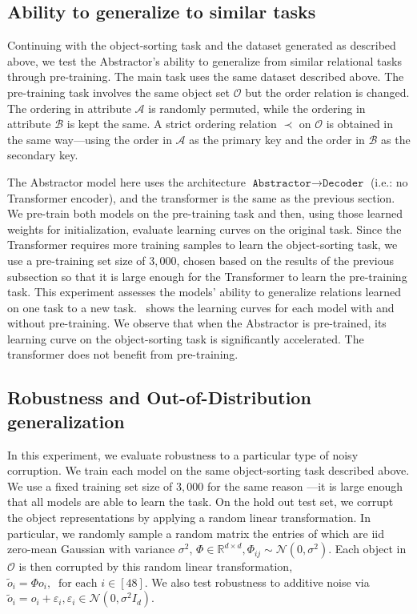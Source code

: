 \subsection{Ability to generalize to similar tasks}

Continuing with the object-sorting task and the dataset generated as described above, we test the Abstractor's ability to generalize from similar relational tasks through pre-training. The main task uses the same dataset described above. The pre-training task involves the same object set $\mathcal{O}$ but the order relation is changed. The ordering in attribute $\mathcal{A}$ is randomly permuted, while the ordering in attribute $\mathcal{B}$ is kept the same. A strict ordering relation $\prec$ on $\mathcal{O}$ is obtained in the same way---using the order in $\mathcal{A}$ as the primary key and the order in $\mathcal{B}$ as the secondary key.

The Abstractor model here uses the architecture $\texttt{Abstractor} \to \texttt{Decoder}$ (i.e.: no Transformer
encoder), and the transformer is the same as the previous section. We pre-train both models on the pre-training task
and then, using those learned weights for initialization, evaluate learning curves on the original task. Since the
Transformer requires more training samples to learn the object-sorting task, we use a pre-training set size of $3,000$, chosen based on the results of the previous subsection so that it is large enough for the Transformer to learn the pre-training task. This experiment assesses the models' ability to generalize relations learned on one task to a new task.~ shows the learning curves for each model with and without pre-training. We observe that when the Abstractor is pre-trained, its learning curve on the object-sorting task is significantly accelerated. The transformer does not benefit from pre-training.

\subsection{Robustness and Out-of-Distribution generalization}
In this experiment, we evaluate robustness to a particular type of noisy corruption. We train each model on the same
object-sorting task described above. We use a fixed training set size of $3,000$ for the same reason
---it is large enough that all models are able to learn the task. On the hold out test set, we corrupt the object
representations by applying a random linear transformation. In particular, we randomly sample a random matrix the
entries of which are iid zero-mean Gaussian with variance $\sigma^2$, $\Phi \in \mathbb{R}^{d \times d}, \Phi_{ij} \sim \mathcal{N}(0, \sigma^2)$. Each object in $\mathcal{O}$ is then corrupted by this random linear transformation,
$\tilde{o}_i = \Phi o_i, \ \text{ for each } i \in [48]$. We also test robustness to additive noise via $\tilde{o}_i = o_i + \varepsilon_i, \varepsilon_i \in \mathcal{N}(0, \sigma^2 I_d)$.


